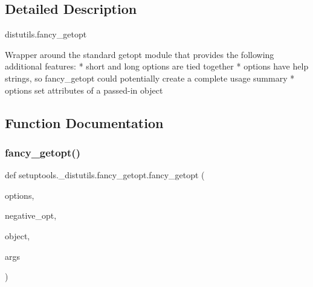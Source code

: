 \subsection{Detailed Description}
\begin{DoxyVerb}distutils.fancy_getopt

Wrapper around the standard getopt module that provides the following
additional features:
  * short and long options are tied together
  * options have help strings, so fancy_getopt could potentially
    create a complete usage summary
  * options set attributes of a passed-in object
\end{DoxyVerb}
 

\subsection{Function Documentation}
\mbox{\label{namespacesetuptools_1_1__distutils_1_1fancy__getopt_a47ff59acdd9c80c1d227b4c57fc76f24}} 
\subsubsection{\texorpdfstring{fancy\+\_\+getopt()}{fancy\_getopt()}}
{\footnotesize\ttfamily def setuptools.\+\_\+distutils.\+fancy\+\_\+getopt.\+fancy\+\_\+getopt (\begin{DoxyParamCaption}\item[{}]{options,  }\item[{}]{negative\+\_\+opt,  }\item[{}]{object,  }\item[{}]{args }\end{DoxyParamCaption})}

\mbox{\label{namespacesetuptools_1_1__distutils_1_1fancy__getopt_a84337e4a816ccdb085cd6beb89ce7b98}} 

